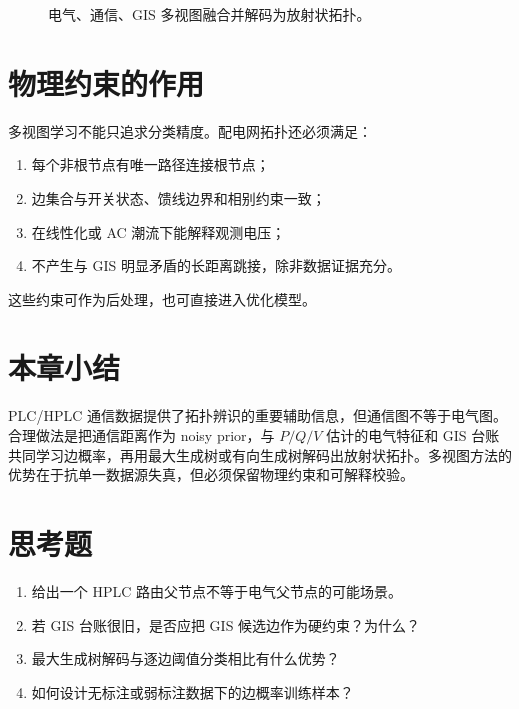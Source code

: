 \begin{figure}[htbp]
  \centering
  
  \caption{电气、通信、GIS 多视图融合并解码为放射状拓扑。}
  \label{fig:multiview_flow}
\end{figure}

\section{物理约束的作用}

多视图学习不能只追求分类精度。配电网拓扑还必须满足：
\begin{enumerate}[label=(\arabic*)]
  \item 每个非根节点有唯一路径连接根节点；
  \item 边集合与开关状态、馈线边界和相别约束一致；
  \item 在线性化或 AC 潮流下能解释观测电压；
  \item 不产生与 GIS 明显矛盾的长距离跳接，除非数据证据充分。
\end{enumerate}
这些约束可作为后处理，也可直接进入优化模型。

\section{本章小结}

PLC/HPLC 通信数据提供了拓扑辨识的重要辅助信息，但通信图不等于电气图。合理做法是把通信距离作为 noisy prior，与 $P/Q/V$ 估计的电气特征和 GIS 台账共同学习边概率，再用最大生成树或有向生成树解码出放射状拓扑。多视图方法的优势在于抗单一数据源失真，但必须保留物理约束和可解释校验。

\section*{思考题}
\begin{enumerate}
  \item 给出一个 HPLC 路由父节点不等于电气父节点的可能场景。
  \item 若 GIS 台账很旧，是否应把 GIS 候选边作为硬约束？为什么？
  \item 最大生成树解码与逐边阈值分类相比有什么优势？
  \item 如何设计无标注或弱标注数据下的边概率训练样本？
\end{enumerate}
